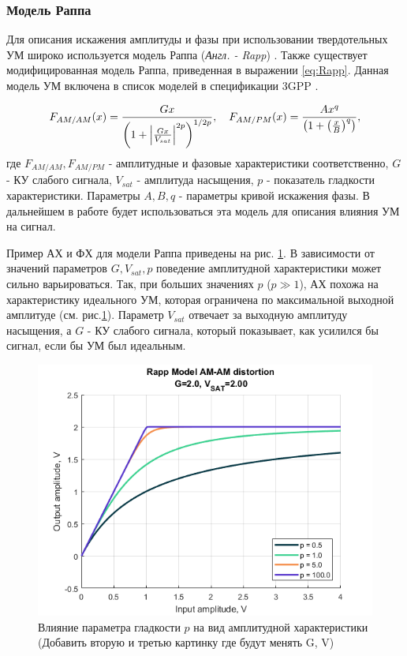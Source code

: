 \subsubsection{Модель Раппа}
Для описания искажения амплитуды и фазы при использовании твердотельных УМ
широко используется модель Раппа (\textit{Англ. - Rapp}) \cite{Rapp1991}.
Также существует модифицированная модель Раппа, приведенная в выражении
\ref{eq:Rapp}. Данная модель УМ включена в список моделей в спецификации
3GPP \cite{3gpp.38.803}.

\begin{equation}
    F_{AM/AM}(x) = \frac{G x}{\left( 1 + \abs{\frac{Gx}{V_{sat}}}^{2p}\right)^{1/2p}},
    \quad 
    F_{AM/PM}(x) = \frac{Ax^q}{\left(1+\left(\frac{x}{B}\right)^q\right)},
    \label{eq:Rapp}
\end{equation}
где $F_{AM/AM}, F_{AM/PM}$ - амплитудные и фазовые характеристики
соответственно, $G$ - КУ слабого сигнала, $V_{sat}$ - амплитуда насыщения,
$p$ - показатель гладкости характеристики. Параметры $A,B,q$ - параметры
кривой искажения фазы. В дальнейшем в работе будет использоваться эта
модель для описания влияния УМ на сигнал.

Пример АХ и ФХ для модели Раппа приведены на  рис. \ref{fig:rapp_p_parameters}.
В зависимости от значений параметров $G, V_{sat}, p$ поведение амплитудной
характеристики может сильно варьироваться. Так, при больших значениях $p$
($p\gg 1$), АХ похожа на характеристику идеального УМ, которая ограничена
по максимальной выходной амплитуде (см. рис.\ref{fig:rapp_p_parameters}).
Параметр $V_{sat}$ отвечает за выходную амплитуду насыщения, а $G$ - КУ
слабого сигнала, который показывает, как усилился бы сигнал, если бы УМ был 
идеальным.
\begin{figure}[h!]
    \centering
    \includegraphics[width=0.7\linewidth]{figs/rapp_p.png}
    \caption{Влияние параметра гладкости $p$ на вид амплитудной
    характеристики (Добавить вторую и третью картинку где будут менять G, V)}
    \label{fig:rapp_p_parameters}
\end{figure}

